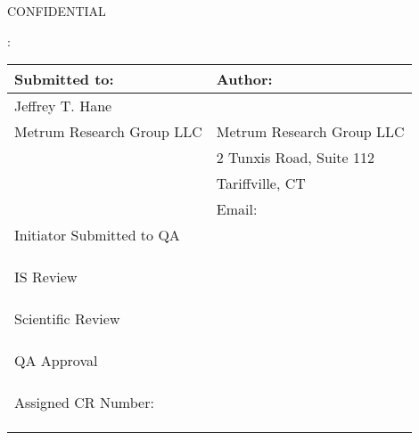 \documentclass[]{article}
\title{}
\author{}
\date{}
\begin{document}
\setlength{\parindent}{0pt}


\vspace*{1cm}
\begin{center}
{\large CONFIDENTIAL}


\vspace*{1cm}


\vspace*{1cm}

{\huge : }
\vspace{3.0cm}

\begin{tabular}{|p{7cm}|p{7cm}|}\hline
Submitted to: & Author:\\\hline
Jeffrey T. Hane &  \\
Metrum Research Group LLC & Metrum Research Group LLC\\
  & 2 Tunxis Road, Suite 112\\
  & Tariffville, CT\\
  & Email:   \\\hline

  Initiator Submitted to QA   & \\

  & \\
  & \\
  & \\\hline

  IS Review   & \\

  & \\
  & \\
  & \\\hline
  
  Scientific Review   & \\

  & \\
  & \\
  & \\\hline


QA Approval  & \\

 & \\
 & \\
 & \\\hline

 Assigned CR Number: & \\

 & \\
 & \\
 & \\\hline


\end{tabular}

\end{center}
\end{document}
